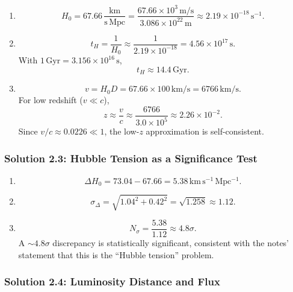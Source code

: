 \begin{enumerate}[label=(\alph*)]
  \item
  \[
    H_0 = 67.66\,\frac{\mathrm{km}}{\mathrm{s\,Mpc}}
    = \frac{67.66\times 10^3\,\mathrm{m/s}}{3.086\times 10^{22}\,\mathrm{m}}
    \approx 2.19\times 10^{-18}\,\mathrm{s^{-1}}.
  \]

  \item
  \[
    t_H = \frac{1}{H_0} \approx \frac{1}{2.19\times 10^{-18}} = 4.56\times 10^{17}\,\mathrm{s}.
  \]
  With $1\,\mathrm{Gyr}=3.156\times 10^{16}\,\mathrm{s}$,
  \[
    t_H \approx 14.4\,\mathrm{Gyr}.
  \]

  \item
  \[
    v=H_0D = 67.66\times 100\,\mathrm{km/s} = 6766\,\mathrm{km/s}.
  \]
  For low redshift ($v\ll c$),
  \[
    z\approx \frac{v}{c} \approx \frac{6766}{3.0\times 10^5} \approx 2.26\times 10^{-2}.
  \]
  Since $v/c\approx 0.0226\ll 1$, the low-$z$ approximation is self-consistent.
\end{enumerate}

\subsubsection*{Solution 2.3: Hubble Tension as a Significance Test}

\begin{enumerate}[label=(\alph*)]
  \item
  \[
    \Delta H_0 = 73.04-67.66 = 5.38\,\mathrm{km\,s^{-1}\,Mpc^{-1}}.
  \]

  \item
  \[
    \sigma_\Delta = \sqrt{1.04^2+0.42^2} = \sqrt{1.258} \approx 1.12.
  \]

  \item
  \[
    N_\sigma = \frac{5.38}{1.12} \approx 4.8\sigma.
  \]
  A $\sim 4.8\sigma$ discrepancy is statistically significant, consistent with the notes' statement that this is the ``Hubble tension'' problem.
\end{enumerate}

\subsubsection*{Solution 2.4: Luminosity Distance and Flux}

